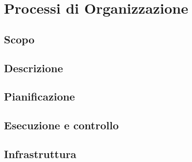 \documentclass[12pt,a4paper]{article}
\begin{document}
\newpage

\section{Processi di Organizzazione} %

\subsection{Scopo} %

\subsection{Descrizione} %

\subsection{Pianificazione} %

\subsection{Esecuzione e controllo} %

\subsection{Infrastruttura} %

\newpage
\end{document}
